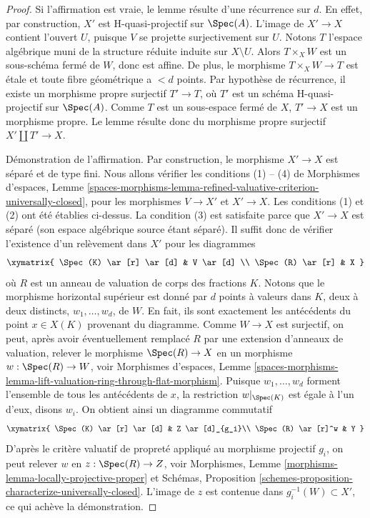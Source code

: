 \begin{proof}
\medskip\noindent
Si l'affirmation est vraie, le lemme résulte d'une récurrence sur $d$.
En effet, par construction, $X'$ est H-quasi-projectif sur $\Spec(A)$.
L'image de $X' \to X$ contient l'ouvert $U$, puisque $V$ se projette surjectivement sur $U$.
Notons $T$ l'espace algébrique muni de la structure réduite induite sur $X \setminus U$.
Alors $T \times_X W$ est un sous-schéma fermé de $W$, donc est affine.
De plus, le morphisme $T \times_X W \to T$ est \'etale et toute fibre géométrique
a $< d$ points. Par hypothèse de récurrence, il existe un morphisme propre
surjectif $T' \to T$, où $T'$ est un schéma H-quasi-projectif
sur $\Spec(A)$. Comme $T$ est un sous-espace fermé de $X$,
$T' \to X$ est un morphisme propre. Le lemme résulte donc du
morphisme propre surjectif $X' \amalg T' \to X$.

\medskip\noindent
Démonstration de l'affirmation. Par construction, le morphisme $X' \to X$ est séparé
et de type fini. Nous allons vérifier les conditions (1) -- (4) de
Morphismes d'espaces, Lemme
\ref{spaces-morphisms-lemma-refined-valuative-criterion-universally-closed},
pour les morphismes $V \to X'$ et $X' \to X$.
Les conditions (1) et (2) ont été établies ci-dessus.
La condition (3) est satisfaite parce que $X' \to X$ est séparé (son
espace algébrique source étant séparé). Il suffit donc de vérifier
l'existence d'un relèvement dans $X'$ pour les diagrammes
$$
\xymatrix{
\Spec(K) \ar[r] \ar[d] & V \ar[d] \\
\Spec(R) \ar[r] & X
}
$$
où $R$ est un anneau de valuation de corps des fractions $K$.
Notons que le morphisme horizontal supérieur est donné par $d$ points à valeurs dans
$K$, deux à deux distincts, $w_1, \ldots, w_d$, de $W$. En fait, ils
sont exactement les antécédents du point $x \in X(K)$
provenant du diagramme. Comme $W \to X$ est surjectif,
on peut, après avoir éventuellement remplacé $R$ par une extension d'anneaux de valuation,
relever le morphisme $\Spec(R) \to X$ en un morphisme $w : \Spec(R) \to W$, voir
Morphismes d'espaces, Lemme
\ref{spaces-morphisms-lemma-lift-valuation-ring-through-flat-morphism}.
Puisque $w_1, \ldots, w_d$ forment l'ensemble de tous les antécédents de
$x$, la restriction $w|_{\Spec(K)}$ est égale à l'un d'eux, disons $w_i$.
On obtient ainsi un diagramme commutatif
$$
\xymatrix{
\Spec(K) \ar[r] \ar[d] &  Z \ar[d]_{g_i}\\
\Spec(R) \ar[r]^w & Y
}
$$
D'après le critère valuatif de propreté appliqué au morphisme projectif
$g_i$, on peut relever $w$ en $z : \Spec(R) \to Z$, voir
Morphismes, Lemme \ref{morphisms-lemma-locally-projective-proper}
et
Schémas, Proposition \ref{schemes-proposition-characterize-universally-closed}.
L'image de $z$ est contenue dans $g_i^{-1}(W) \subset X'$, ce qui achève la démonstration.
\end{proof}







